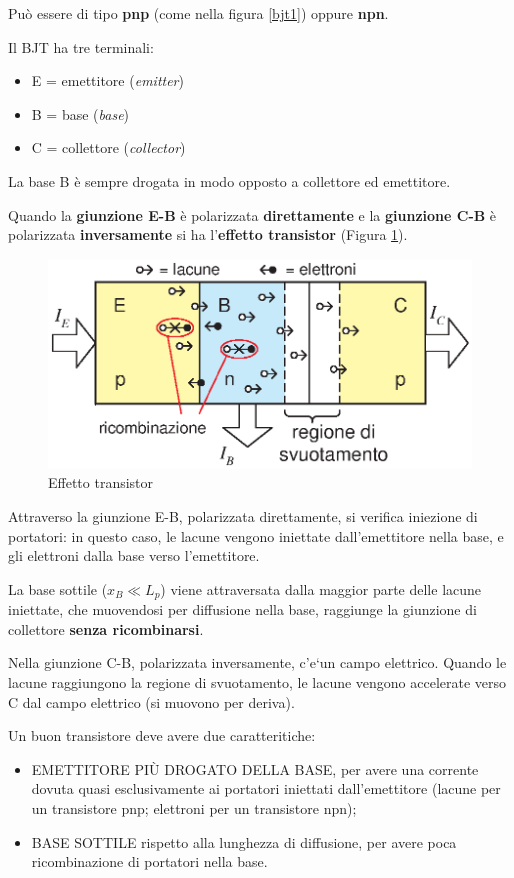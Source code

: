 \documentclass[10pt,a4paper,twoside,twocolumn]{article}
\begin{document}
Pu\`o essere di tipo \textbf{pnp} (come nella figura \ref{bjt1}) oppure \textbf{npn}.


Il BJT ha tre terminali:
\begin{itemize}
 \item E = emettitore (\emph{emitter})
\item B = base (\emph{base})
\item C = collettore (\emph{collector})
\end{itemize}
La base B \`e sempre drogata in modo opposto a collettore ed emettitore.

Quando la \textbf{giunzione E-B} \`e polarizzata \textbf{direttamente}
e la \textbf{giunzione C-B} \`e polarizzata \textbf{inversamente} 
si ha l'\textbf{effetto transistor} (Figura \ref{bjt3}).
\begin{figure}[h]
\centering
\includegraphics[width=0.7\columnwidth]{bjt3.eps}
\caption{Effetto transistor}
\label{bjt3}
\end{figure}

Attraverso la giunzione E-B, polarizzata direttamente, si verifica iniezione di portatori: in questo caso, le lacune vengono iniettate dall'emettitore nella base, e gli elettroni dalla base verso l'emettitore.

La base sottile ($x_B \ll L_p$) viene attraversata dalla maggior parte delle lacune iniettate, 
che muovendosi per diffusione nella base, raggiunge 
la giunzione di collettore \textbf{senza ricombinarsi}.

Nella giunzione C-B, polarizzata inversamente, c'e`un campo elettrico. Quando le lacune raggiungono la regione di svuotamento, le lacune vengono accelerate verso C dal campo elettrico (si muovono per deriva).


Un buon transistore deve avere due caratteritiche:
\begin{itemize}
\item %
\color{red}
EMETTITORE PI\`U DROGATO DELLA BASE\color{black},
per avere una corrente dovuta quasi esclusivamente ai portatori iniettati dall'emettitore
(lacune per un transistore pnp; elettroni per un transistore npn);
\item %
\color{red}
BASE SOTTILE rispetto alla lunghezza di diffusione\color{black},
per avere poca ricombinazione di portatori nella base.
\end{itemize}
\end{document}
